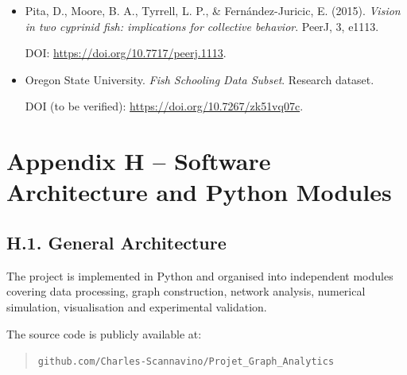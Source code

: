 \documentclass[10pt,a4paper]{article}
\begin{document}
\begin{itemize}
DOI:
\url{https://doi.org/10.1109/TAC.2007.895842}.


\item
Pita, D., Moore, B. A.,
Tyrrell, L. P.,
\& Fern\'andez-Juricic, E. (2015).
\emph{Vision in two cyprinid fish:
implications for collective behavior}.
PeerJ, 3, e1113.

DOI:
\url{https://doi.org/10.7717/peerj.1113}.


\item
Oregon State University.
\emph{Fish Schooling Data Subset}.
Research dataset.

DOI (to be verified):
\url{https://doi.org/10.7267/zk51vq07c}.

\end{itemize}



\section*{Appendix H -- Software Architecture and Python Modules}
\label{app:software_architecture}

\subsection*{H.1. General Architecture}

The project is implemented in Python and organised into
independent modules covering data processing, graph
construction, network analysis, numerical simulation,
visualisation and experimental validation.

The source code is publicly available at:

\begin{quote}
\texttt{github.com/Charles-Scannavino/Projet\_Graph\_Analytics}
\end{quote}
\end{document}
